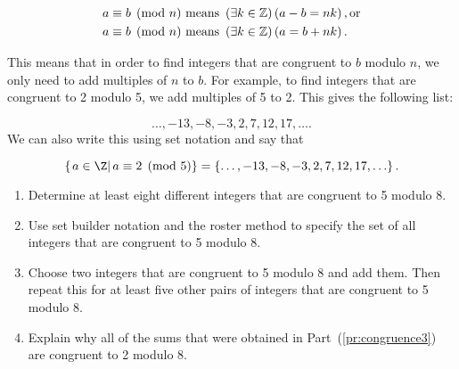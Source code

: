 \[
\begin{aligned}
  a &\equiv b \pmod n \text{  means  }\left( {\exists k \in \mathbb{Z}} \right)\left( {a - b = nk} \right), \text{or} \hfill \\
  a &\equiv b \pmod n \text{  means  }\left( {\exists k \in \mathbb{Z}} \right)\left( {a = b + nk} \right). \hfill \\ 
\end{aligned}
\]

This means that in order to find integers that are congruent to $b$ modulo $n$, we only need to add multiples of $n$ to $b$.  For example, to find integers that are congruent to 2 modulo 5, we add multiples of 5 to 2.  This gives the following list:

\[
\ldots, -13, -8, -3, 2, 7, 12, 17, \ldots .
\]
We can also write this using set notation and say that

\[
\left\{ \left. a \in \Z \right| a \equiv 2 \pmod 5 \right\} = 
\left\{ \ldots, -13, -8, -3, 2, 7, 12, 17, \ldots \right\}.
\]
\hbreak

\begin{prog}\label{pr:congruence} \hfill
\begin{enumerate}
\item  Determine at least eight different integers that are congruent to 5 modulo 8.

\item Use set builder notation and the roster method to specify the set of all integers that are congruent to 5 modulo 8.

\item Choose two integers that are congruent to 5 modulo 8 and add them.  Then repeat this for at least five other pairs of integers that are congruent to 5 modulo 8.
\label{pr:congruence3}%

\item Explain why all of the sums that were obtained in Part~(\ref{pr:congruence3}) are congruent to 2 modulo 8.
\end{enumerate}
\end{prog}
\hbreak


